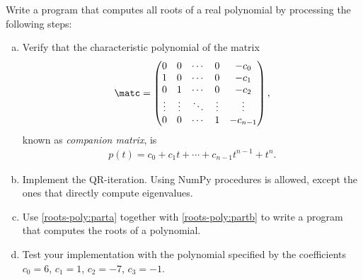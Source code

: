 \begin{Problem}[Programming]
  Write a program that computes all roots of a real polynomial by
  processing the following steps:
  \begin{enumerate}[(a)]
  \item\label{roots-poly:parta}
    Verify that the characteristic polynomial of the matrix
    \begin{gather*}
      \matc =
      \begin{pmatrix}
        0 & 0 & \cdots & 0 & -c_0 \\
        1 & 0 & \cdots & 0 & -c_1 \\
        0 & 1 & \cdots & 0 & -c_2\\
        \vdots & \vdots & \ddots & \vdots & \vdots \\
        0 & 0 & \cdots & 1 & -c_{n-1}
      \end{pmatrix}
      ,
    \end{gather*}
    known as \textit{companion matrix}, is
    \begin{gather*}
      p(t)=c_{0}+c_{1}t+\cdots +c_{{n-1}}t^{{n-1}}+t^{n}.
    \end{gather*}
  \item\label{roots-poly:partb} Implement the QR-iteration. Using
    NumPy procedures is allowed, except the ones that directly
    compute eigenvalues.
  \item Use \eqref{roots-poly:parta} together with
    \eqref{roots-poly:partb} to write a program that computes the
    roots of a polynomial.
  \item Test your implementation with the polynomial specified by
    the coefficients $c_0=6$, $c_1=1$, $c_2=-7$, $c_3=-1$.
  \end{enumerate}
\end{Problem}
